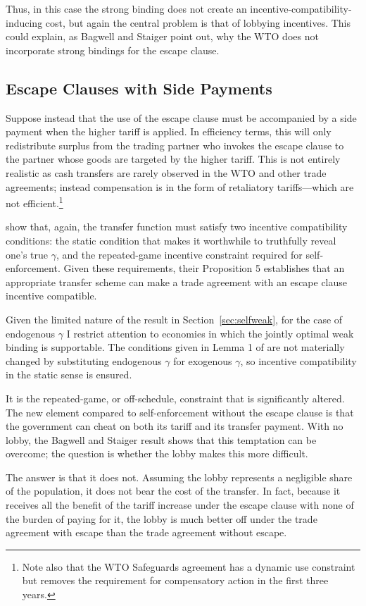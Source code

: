 \documentclass[12pt]{article}
\newcommand{\ga}{\gamma}
\begin{document}
Thus, in this case the strong binding does not create an incentive-compatibility-inducing cost, but again the central problem is that of lobbying incentives. This could explain, as Bagwell and Staiger point out, why the WTO does not incorporate strong bindings for the escape clause.

\subsection{Escape Clauses with Side Payments}
Suppose instead that the use of the escape clause must be accompanied by a side payment when the higher tariff is applied. In efficiency terms, this will only redistribute surplus from the trading partner who invokes the escape clause to the partner whose goods are targeted by the higher tariff. This is not entirely realistic as cash transfers are rarely observed in the WTO and other trade agreements; instead compensation is in the form of retaliatory tariffs---which are not efficient.\footnote{Note also that the WTO Safeguards agreement has a dynamic use constraint but removes the requirement for compensatory action in the first three years.}

\Textcite{bs2005} show that, again, the transfer function must satisfy two incentive compatibility conditions: the static condition that makes it worthwhile to truthfully reveal one's true $\ga$, and the repeated-game incentive constraint required for self-enforcement. Given these requirements, their Proposition 5 establishes that an appropriate transfer scheme can make a trade agreement with an escape clause incentive compatible.

Given the limited nature of the result in Section~\ref{sec:selfweak}, for the case of endogenous $\ga$ I restrict attention to economies in which the jointly optimal weak binding is supportable. The conditions given in Lemma 1 of \Textcite{bs2005} are not materially changed by substituting endogenous $\ga$ for exogenous $\ga$, so incentive compatibility in the static sense is ensured.

It is the repeated-game, or off-schedule, constraint that is significantly altered. The new element compared to self-enforcement without the escape clause is that the government can cheat on both its tariff and its transfer payment. With no lobby, the Bagwell and Staiger result shows that this temptation can be overcome; the question is whether the lobby makes this more difficult.

The answer is that it does not. Assuming the lobby represents a negligible share of the population, it does not bear the cost of the transfer. In fact, because it receives all the benefit of the tariff increase under the escape clause with none of the burden of paying for it, the lobby is much better off under the trade agreement with escape than the trade agreement without escape.
\end{document}
